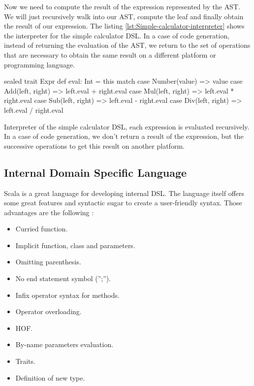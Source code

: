 Now we need to compute the result of the expression represented by the
\gls{AST}. We will just recursively walk into our AST, compute the
leaf and finally obtain the result of our expression. The listing
\ref{lst:Simple-calculator-interpreter} shows the interpreter for the simple
calculator \gls{DSL}. In a case of code generation, instead of returning the
evaluation of the \gls{AST}, we return to the set of operations that are necessary
to obtain the same result on a different platform or programming language.

\begin{listing}[ht]
\centering
\begin{scalacode}
sealed trait Expr {
  def eval: Int = this match {
    case Number(value) => value
    case Add(left, right) => left.eval + right.eval
    case Mul(left, right) => left.eval * right.eval
    case Sub(left, right) => left.eval - right.eval
    case Div(left, right) => left.eval / right.eval
  }
}
\end{scalacode}
\caption[Interpreter of the simple calculator \gls{DSL}]{Interpreter of the
simple calculator \gls{DSL}, each expression is evaluated recursively. In a case
of code generation, we don't return a result of the expression, but the
successive operations to get this result on another platform.}
\label{lst:Simple-calculator-interpreter}
\end{listing}

\subsection{Internal Domain Specific Language}
\label{subsec:scala_internal_dsl}

Scala is a great language for developing internal \gls{DSL}. The language itself
offers some great features and syntactic sugar to create a user-friendly
syntax. Those advantages are the following \cite{filipkrikava2013}:

\begin{itemize}
\item Curried function.
\item Implicit function, class and parameters.
\item Omitting parenthesis.
\item No end statement symbol ('';'').
\item Infix operator syntax for methods.
\item Operator overloading.
\item \gls{HOF}.
\item By-name parameters evaluation.
\item Traits.
\item Definition of new type.
\end{itemize}

